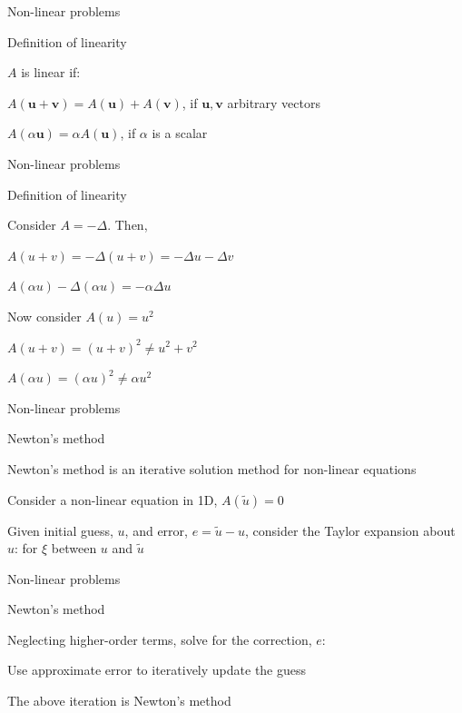 \documentclass[18pt,xcolor=table]{beamer}
\begin{document}

\begin{frame}{Non-linear problems}
\begin{block}{Definition of linearity}
\bit
\item $A$ is linear if:
\bit
\item $A(\mathbf{u} + \mathbf{v}) = A(\mathbf{u}) + A(\mathbf{v})$, if $\mathbf{u},\mathbf{v}$ arbitrary vectors
\item $A(\alpha\mathbf{u}) = \alpha A(\mathbf{u})$, if $\alpha$ is a scalar
\eit
\eit
\end{block}
\end{frame}

\begin{frame}{Non-linear problems}
\begin{block}{Definition of linearity}
\bit
\item Consider $A = -\Delta$. Then,
\bit
\item $A(u + v) = -\Delta(u + v) = -\Delta u - \Delta v$
\item $A(\alpha u) -\Delta (\alpha u) = -\alpha \Delta u$
\eit
\item Now consider $A(u) = u^2$
\bit
\item $A(u + v) = (u + v)^2 \neq u^2 + v^2$
\item $A(\alpha u) = (\alpha u)^2 \neq \alpha u^2$
\eit
\eit
\end{block}
\end{frame}

\begin{frame}{Non-linear problems}
\begin{block}{Newton's method}
\bit
\item Newton's method is an iterative solution method for non-linear equations
\item Consider a non-linear equation in 1D, $A(\tilde{u}) = 0$
\item Given initial guess, $u$, and error, $e = \tilde{u} - u$, consider the Taylor expansion about $u$:
for $\xi$ between $u$ and $\tilde{u}$
\eit
\end{block}
\end{frame}

\begin{frame}{Non-linear problems}
\begin{block}{Newton's method}
\bit
\item Neglecting higher-order terms, solve for the correction, $e$:
\item Use approximate error to iteratively update the guess
\item The above iteration is Newton's method
\eit
\end{block}
\end{frame}
\end{document}
